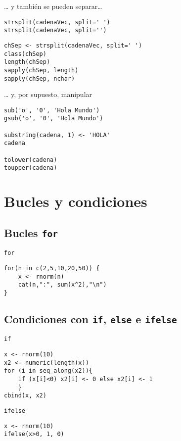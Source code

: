 \documentclass[xcolor={usenames,svgnames,dvipsnames}]{beamer}
\begin{document}
\begin{frame}[fragile,label=sec-5-3-5]{\ldots{} y también se pueden separar\ldots{}}
 \lstset{language=R,numbers=none}
\begin{lstlisting}
strsplit(cadenaVec, split=' ')
strsplit(cadenaVec, split='')
\end{lstlisting}

\lstset{language=R,numbers=none}
\begin{lstlisting}
chSep <- strsplit(cadenaVec, split=' ')
class(chSep)
length(chSep)
sapply(chSep, length)
sapply(chSep, nchar)
\end{lstlisting}
\end{frame}
\begin{frame}[fragile,label=sec-5-3-6]{\ldots{} y, por supuesto, manipular}
 \lstset{language=R,numbers=none}
\begin{lstlisting}
sub('o', '0', 'Hola Mundo')
gsub('o', '0', 'Hola Mundo')

substring(cadena, 1) <- 'HOLA'
cadena

tolower(cadena)
toupper(cadena)
\end{lstlisting}
\end{frame}


\section{Bucles y condiciones}
\label{sec-6}
\subsection{Bucles \texttt{for}}
\label{sec-6-1}
\begin{frame}[fragile,label=sec-6-1-1]{\texttt{for}}
 \lstset{language=R,numbers=none}
\begin{lstlisting}
for(n in c(2,5,10,20,50)) {
    x <- rnorm(n)
    cat(n,":", sum(x^2),"\n")
}
\end{lstlisting}
\end{frame}

\subsection{Condiciones con \texttt{if}, \texttt{else} e \texttt{ifelse}}
\label{sec-6-2}
\begin{frame}[fragile,label=sec-6-2-1]{\texttt{if}}
 \lstset{language=R,numbers=none}
\begin{lstlisting}
x <- rnorm(10)
x2 <- numeric(length(x))
for (i in seq_along(x2)){
    if (x[i]<0) x2[i] <- 0 else x2[i] <- 1
    }
cbind(x, x2)
\end{lstlisting}
\end{frame}

\begin{frame}[fragile,label=sec-6-2-2]{\texttt{ifelse}}
 \lstset{language=R,numbers=none}
\begin{lstlisting}
x <- rnorm(10)
ifelse(x>0, 1, 0)
\end{lstlisting}
\end{frame}
\end{document}
